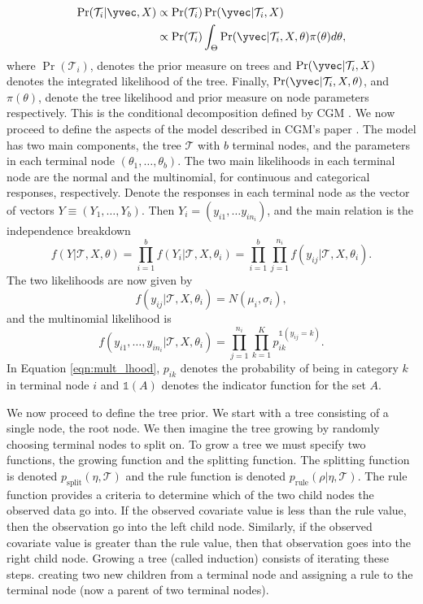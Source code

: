 \begin{align}
 \Pr(\mathcal{T}_i \vert \yvec, X ) &\propto \Pr(\mathcal{T}_i)\Pr(\yvec \vert \mathcal{T}_i, X)\\
  &\propto \Pr(\mathcal{T}_i)\int_{\Theta}\Pr(\yvec \vert \mathcal{T}_i, X, \theta)\pi(\theta)d\theta,
\end{align}
where $\Pr(\mathcal{T}_i)$, denotes the prior measure on trees and $\Pr(\yvec \vert \mathcal{T}_i, X)$ denotes the integrated likelihood of the tree. Finally, $\Pr(\yvec \vert \mathcal{T}_i, X, \theta)$, and $\pi(\theta)$, denote the tree likelihood and prior measure on node parameters respectively. This is the conditional decomposition defined by CGM \cite{chipman1998bayesian}. We now proceed to define the aspects of the model described in CGM's paper \cite{chipman1998bayesian}. 
The model has two main components, the tree $\mathcal{T}$ with $b$ terminal nodes, and the parameters in each terminal node $(\theta_1,\dots,\theta_b)$. 
The two main likelihoods in each terminal node are the normal and the multinomial, for continuous and categorical responses, respectively. 
Denote the responses in each terminal node as the vector  of vectors $Y\equiv (Y_1, \dots, Y_b)$. Then $Y_i = (y_{i1}, \dots y_{in_i})$, and the main relation is the independence breakdown 
\begin{equation}
f(Y\vert \mathcal{T}, X, \theta) =\prod_{i=1}^b f(Y_i\vert \mathcal{T}, X, \theta_i) = \prod_{i=1}^b \prod_{j=1}^{n_i} f(y_{ij} \vert \mathcal{T}, X, \theta_i).
\end{equation}
The two likelihoods are now given by
\begin{equation}
f(y_{ij} \vert \mathcal{T}, X, \theta_i) = N(\mu_i,\sigma_i),
\end{equation}
and the multinomial likelihood is
\begin{equation}\label{eqn:mult_lhood}
f(y_{i1}, \dots ,y_{in_i} \vert \mathcal{T}, X, \theta_i) = \prod_{j=1}^{n_i}\prod_{k=1}^K p_{ik}^{\mathds{1}(y_{ij}=k)}.
\end{equation}
In Equation \ref{eqn:mult_lhood}, $p_{ik}$ denotes the probability of being in category $k$ in terminal node $i$ and $\mathds{1}(A)$ denotes the indicator function for the set $A$. 

We now proceed to define the tree prior. We start with a tree consisting of a single node, the root node. We then imagine the tree growing by randomly choosing terminal nodes to split on. To grow a tree we must specify two functions, the growing function and the splitting function.  The splitting function is denoted $p_{\text{split}}(\eta, \mathcal{T})$ and the rule function is denoted $p_{\text{rule}}(\rho \vert \eta, \mathcal{T})$. The rule function provides a criteria to determine which of the two child nodes the observed data go into. If the observed covariate value is less than the rule value, then the observation go into the left child node. Similarly, if the observed covariate value is greater than the rule value, then that observation goes into the right child node. Growing a tree (called induction) consists of iterating these steps. creating two new children from a terminal node and assigning a rule to the terminal node (now a parent of two terminal nodes). 

